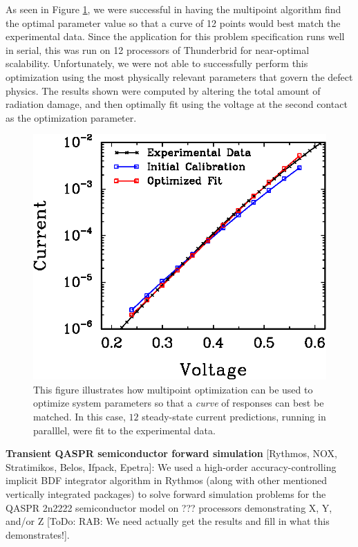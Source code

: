 \documentclass[pdf,ps2pdf,11pt]{SANDreport}
\begin{document}
As seen in Figure {}\ref{fig:multiPointFit}, we were successful in having the
multipoint algorithm find the optimal parameter value so that a curve of 12
points would best match the experimental data. Since the application for this
problem specification runs well in serial, this was run on 12 processors of
Thunderbrid for near-optimal scalability. Unfortunately, we were not able to
successfully perform this optimization using the most physically relevant
parameters that govern the defect physics. The results shown were computed by
altering the total amount of radiation damage, and then optimally fit using
the voltage at the second contact as the optimization parameter.
{\bsinglespace
\begin{figure}
\begin{center}
\includegraphics*[angle=0,scale=1.00,width=0.8\linewidth
]{multiPointFit}
\end{center}
\caption{
\label{fig:multiPointFit}
This figure illustrates how multipoint optimization can be used to optimize
system parameters so that a {\em curve} of responses can best be matched. In
this case, $12$ steady-state current predictions, running in paralllel, were
fit to the experimental data.}
\end{figure}
\esinglespace}


{}\noindent\textbf{Transient QASPR semiconductor forward simulation} [Rythmos,
NOX, Stratimikos, Belos, Ifpack, Epetra]: We used a high-order
accuracy-controlling implicit BDF integrator algorithm in Rythmos (along with
other mentioned vertically integrated packages) to solve forward simulation
problems for the QASPR 2n2222 semiconductor model on ??? processors
demonstrating X, Y, and/or Z [ToDo: RAB: We need actually get the results and
fill in what this demonstrates!].
\end{document}
